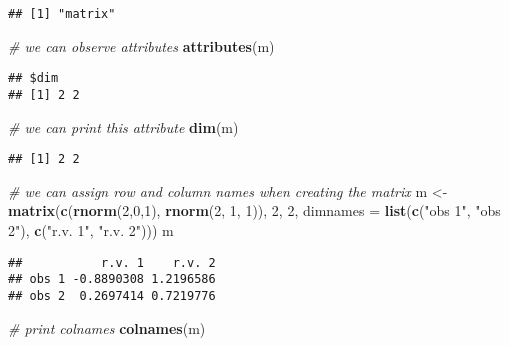 \documentclass[]{article}
\newenvironment{Shaded}{\begin{snugshade}}{\end{snugshade}}
\newcommand{\CommentTok}[1]{\textcolor[rgb]{0.56,0.35,0.01}{\textit{#1}}}
\newcommand{\DataTypeTok}[1]{\textcolor[rgb]{0.13,0.29,0.53}{#1}}
\newcommand{\DecValTok}[1]{\textcolor[rgb]{0.00,0.00,0.81}{#1}}
\newcommand{\KeywordTok}[1]{\textcolor[rgb]{0.13,0.29,0.53}{\textbf{#1}}}
\newcommand{\NormalTok}[1]{#1}
\newcommand{\StringTok}[1]{\textcolor[rgb]{0.31,0.60,0.02}{#1}}
\begin{document}
\begin{verbatim}
## [1] "matrix"
\end{verbatim}

\begin{Shaded}
\begin{Highlighting}[]
\CommentTok{# we can observe attributes}
\KeywordTok{attributes}\NormalTok{(m)}
\end{Highlighting}
\end{Shaded}

\begin{verbatim}
## $dim
## [1] 2 2
\end{verbatim}

\begin{Shaded}
\begin{Highlighting}[]
\CommentTok{# we can print this attribute}
\KeywordTok{dim}\NormalTok{(m)}
\end{Highlighting}
\end{Shaded}

\begin{verbatim}
## [1] 2 2
\end{verbatim}

\begin{Shaded}
\begin{Highlighting}[]
\CommentTok{# we can assign row and column names when creating the matrix}
\NormalTok{m <-}\StringTok{ }\KeywordTok{matrix}\NormalTok{(}\KeywordTok{c}\NormalTok{(}\KeywordTok{rnorm}\NormalTok{(}\DecValTok{2}\NormalTok{,}\DecValTok{0}\NormalTok{,}\DecValTok{1}\NormalTok{), }\KeywordTok{rnorm}\NormalTok{(}\DecValTok{2}\NormalTok{, }\DecValTok{1}\NormalTok{, }\DecValTok{1}\NormalTok{)), }\DecValTok{2}\NormalTok{, }\DecValTok{2}\NormalTok{, }
            \DataTypeTok{dimnames =} \KeywordTok{list}\NormalTok{(}\KeywordTok{c}\NormalTok{(}\StringTok{"obs 1"}\NormalTok{, }\StringTok{"obs 2"}\NormalTok{), }\KeywordTok{c}\NormalTok{(}\StringTok{"r.v. 1"}\NormalTok{, }\StringTok{"r.v. 2"}\NormalTok{)))}
\NormalTok{m}
\end{Highlighting}
\end{Shaded}

\begin{verbatim}
##           r.v. 1    r.v. 2
## obs 1 -0.8890308 1.2196586
## obs 2  0.2697414 0.7219776
\end{verbatim}

\begin{Shaded}
\begin{Highlighting}[]
\CommentTok{# print colnames}
\KeywordTok{colnames}\NormalTok{(m)}
\end{Highlighting}
\end{Shaded}
\end{document}
